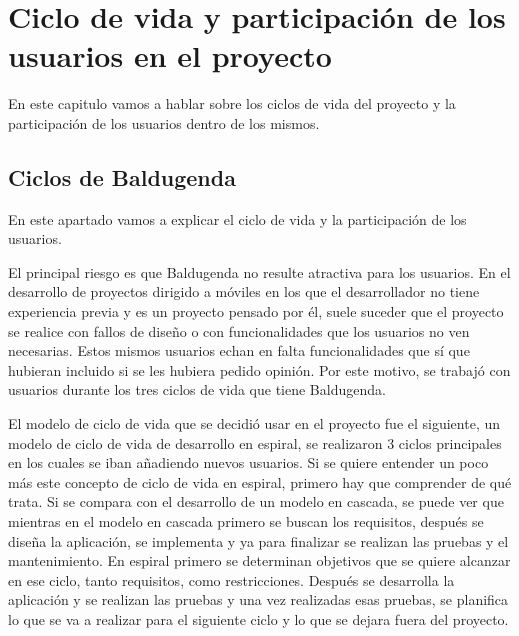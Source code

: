 \chapter{Ciclo de vida y participación de los usuarios en el proyecto}
\label{ch:ciclo de vida}



En este capitulo vamos a hablar sobre los ciclos de vida del proyecto y la participación de los usuarios dentro de los mismos.

\section{Ciclos de Baldugenda}
\label{secc:ciclos de Baldugenda}

En este apartado vamos a explicar el ciclo de vida y la participación de los usuarios. 

El principal riesgo es que Baldugenda no resulte atractiva para los usuarios. En el desarrollo de proyectos dirigido a móviles en los que el desarrollador no tiene experiencia previa y es un proyecto pensado por él, suele suceder que el proyecto se realice con fallos de diseño o con funcionalidades que los usuarios no ven necesarias. Estos mismos usuarios echan en falta funcionalidades que sí que hubieran incluido si se les hubiera pedido opinión. 
Por este motivo, se trabajó con usuarios durante los tres ciclos de vida que tiene Baldugenda.

El modelo de ciclo de vida que se decidió usar en el proyecto fue el siguiente, un modelo de ciclo de vida de desarrollo en espiral\cite{Espiral}\cite{EspiralBoehm}, se realizaron 3 ciclos principales en los cuales se iban añadiendo nuevos usuarios.
Si se quiere entender un poco más este concepto de ciclo de vida en espiral, primero hay que comprender de qué trata. Si se compara con el desarrollo de un modelo en cascada, se puede ver que mientras en el modelo en cascada primero se buscan los requisitos, después se diseña la aplicación, se implementa y ya para finalizar se realizan las pruebas y el mantenimiento. 
En espiral primero se determinan objetivos que se quiere alcanzar en ese ciclo, tanto requisitos, como restricciones. Después se desarrolla la aplicación y se realizan las pruebas y una vez realizadas esas pruebas, se planifica lo que se va a realizar para el siguiente ciclo y lo que se dejara fuera del proyecto. 

